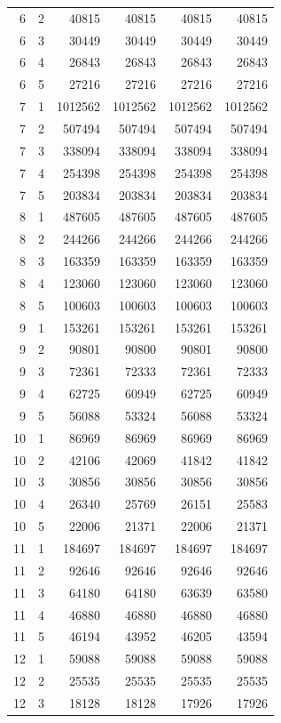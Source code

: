 \begin{longtable}{rrrrrr}
6 & 2 & 40815 & 40815 & 40815 & 40815 \\
6 & 3 & 30449 & 30449 & 30449 & 30449 \\
6 & 4 & 26843 & 26843 & 26843 & 26843 \\
6 & 5 & 27216 & 27216 & 27216 & 27216 \\
7 & 1 & 1012562 & 1012562 & 1012562 & 1012562 \\
7 & 2 & 507494 & 507494 & 507494 & 507494 \\
7 & 3 & 338094 & 338094 & 338094 & 338094 \\
7 & 4 & 254398 & 254398 & 254398 & 254398 \\
7 & 5 & 203834 & 203834 & 203834 & 203834 \\
8 & 1 & 487605 & 487605 & 487605 & 487605 \\
8 & 2 & 244266 & 244266 & 244266 & 244266 \\
8 & 3 & 163359 & 163359 & 163359 & 163359 \\
8 & 4 & 123060 & 123060 & 123060 & 123060 \\
8 & 5 & 100603 & 100603 & 100603 & 100603 \\
9 & 1 & 153261 & 153261 & 153261 & 153261 \\
9 & 2 & 90801 & 90800 & 90801 & 90800 \\
9 & 3 & 72361 & 72333 & 72361 & 72333 \\
9 & 4 & 62725 & 60949 & 62725 & 60949 \\
9 & 5 & 56088 & 53324 & 56088 & 53324 \\
10 & 1 & 86969 & 86969 & 86969 & 86969 \\
10 & 2 & 42106 & 42069 & 41842 & 41842 \\
10 & 3 & 30856 & 30856 & 30856 & 30856 \\
10 & 4 & 26340 & 25769 & 26151 & 25583 \\
10 & 5 & 22006 & 21371 & 22006 & 21371 \\
11 & 1 & 184697 & 184697 & 184697 & 184697 \\
11 & 2 & 92646 & 92646 & 92646 & 92646 \\
11 & 3 & 64180 & 64180 & 63639 & 63580 \\
11 & 4 & 46880 & 46880 & 46880 & 46880 \\
11 & 5 & 46194 & 43952 & 46205 & 43594 \\
12 & 1 & 59088 & 59088 & 59088 & 59088 \\
12 & 2 & 25535 & 25535 & 25535 & 25535 \\
12 & 3 & 18128 & 18128 & 17926 & 17926 \\

\end{longtable}
